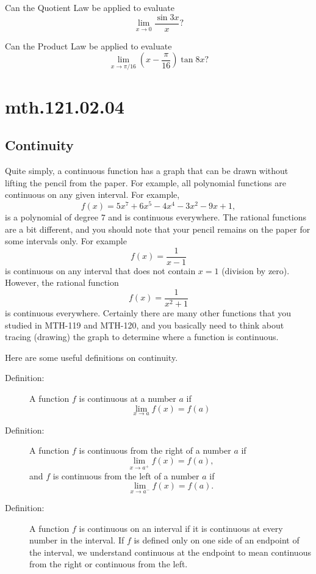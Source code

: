 \documentclass[12pt,addpoints, answers, fleqn]{exam}
\begin{document}
\begin{teacher}
\begin{questions}
Can the Quotient Law be applied to evaluate
\[
\lim_ {x \to 0} \frac{\sin 3x}{x}?
\]

\begin{solution}
\end{solution}
\question 	%

Can the Product Law be applied to evaluate
\[
\lim_{x \to \pi/16}  \left( x - \frac{\pi}{16}\right) \tan 8x?
\]

\end{questions}
\end{teacher}
\vfill
\pagebreak

\section{mth.121.02.04}
\subsection{Continuity}

Quite simply, a continuous function has a graph that can be drawn without lifting the pencil from the paper. For example, all polynomial functions are continuous on any given interval. For example,
\[
f \left( x \right) = 5x^7+6x^5-4x^4-3x^2-9x+1,
\]
is a polynomial of degree $7$ and is continuous everywhere. The rational functions are a bit different, and you should note that your pencil remains on the paper for some intervals only. For example
\[
f\left( x \right) = \frac{1}{x-1}
\]
is continuous on any interval that does not contain $x=1$ (division by zero). However, the rational function
\[
f\left( x \right) = \frac{1}{x^2+1}
\]
is continuous everywhere. Certainly there are many other functions that you studied in MTH-119 and MTH-120, and you basically need to think about tracing (drawing) the graph to determine where a function is continuous.



Here are some useful definitions on continuity.
\begin{description}
\item[Definition:] A function $f$ is continuous at a number $a$ if
\[
\mathop {\lim }\limits_{x \to a }  f \left( x \right) = f \left( a \right)
\]
\item[Definition:] A function $f$ is continuous from the right of a number $a$ if
\[
\mathop {\lim }\limits_{x \to a^+ }  f \left( x \right) = f \left( a \right),
\]
and $f$ is continuous from the left of a number $a$ if
\[
\mathop {\lim }\limits_{x \to a^- }  f \left( x \right) = f \left( a \right).
\]
\item[Definition:] A function $f$ is continuous on an interval if it is continuous at every number in the interval. If $f$ is defined only on one side of an endpoint of the interval, we understand continuous at the endpoint to mean continuous from the right or continuous from the left.
\end{description}
\end{document}
